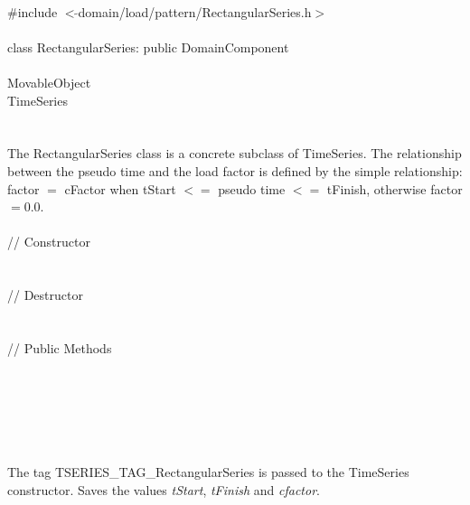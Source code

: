 
   \\
\indent \#include $<\tilde{ }$domain/load/pattern/RectangularSeries.h$>$  \\

  \\
\indent class RectangularSeries: public DomainComponent  \\

 \\
\indent MovableObject \\
\indent\indent TimeSeries \\
\indent\indent{} \\

 \\ 
\indent The RectangularSeries class is a concrete subclass of TimeSeries.
The relationship between the pseudo time and the load factor is
defined by the simple relationship: factor $=$ cFactor when tStart $<=$
pseudo time $<=$ tFinish, otherwise factor $ =0.0$. \\


 \\
\indent // Constructor \\ 
\\ \\
\indent // Destructor \\ 
\\  \\
\indent // Public Methods \\ 
\\
\\
\\
\\

 \\ 
\\ 
The tag TSERIES\_TAG\_RectangularSeries is passed to the TimeSeries
constructor. Saves the values {\em tStart}, {\em tFinish} and {\em
cfactor}. \\


